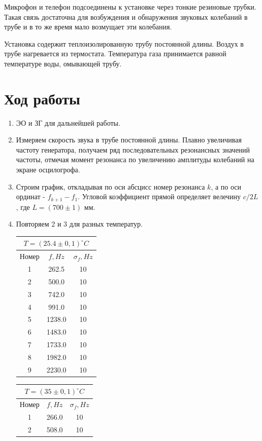 \documentclass[a4paper, 12pt]{article}%
\begin{document}
Микрофон и телефон подсоединены к установке через тонкие резиновые трубки. Такая связь достаточна для возбуждения и обнаружения звуковых колебаний в трубе и в то же время мало возмущает эти колебания.

Установка содержит теплоизолированную трубу постоянной длины. Воздух в трубе нагревается из термостата. Температура газа принимается равной температуре воды, омывающей трубу.  
\section*{Ход работы}
\begin{enumerate}
\item  ЭО и ЗГ для дальнейшей работы.
\item Измеряем скорость звука в трубе постоянной длины. Плавно увеличивая частоту генератора, получаем ряд последовательных резонансных значений частоты, отмечая момент резонанса по увеличению амплитуды колебаний на экране осцилогрофа.
\item Строим график, откладывая по оси абсцисс номер резонанса $k$, а по оси ординат - $f_{k+1} - f_1$. Угловой коэффициент прямой определяет велечину $c / 2L$, где $L = (700 \pm 1)$ мм.
\item Повторяем 2 и 3 для разных температур.\\
\begin{tabular}{|c|c|c|}
\hline
\multicolumn{3}{|c|}{$T = (25.4 \pm 0,1) ^{\circ}C$} \\ \hline
Номер & $f, Hz$ & $\sigma_f, Hz$ \\ \hline
1 & 262.5 & 10 \\ \hline
2 & 500.0 & 10 \\ \hline
3 & 742.0 & 10 \\ \hline
4 & 991.0 & 10 \\ \hline
5 & 1238.0 & 10 \\ \hline
6 & 1483.0 & 10 \\ \hline
7 & 1733.0 & 10 \\ \hline
8 & 1982.0 & 10 \\ \hline
9 & 2230.0 & 10 \\ \hline
\end{tabular}
\begin{tabular}{|c|c|c|}
\hline
\multicolumn{3}{|c|}{$T = (35 \pm 0,1) ^{\circ}C$} \\ \hline
Номер & $f, Hz$ & $\sigma_f, Hz$ \\ \hline
1 & 266.0 & 10 \\ \hline
2 & 508.0 & 10 \\ \hline

\end{tabular}
\end{enumerate}
\end{document}
